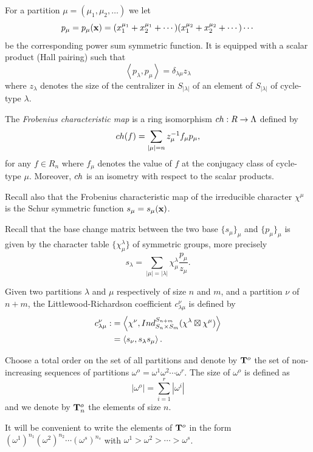 \documentclass[11pt]{article}
\theoremstyle{definition}
\numberwithin{equation}{section}
\newcommand{\x}{{\bf x}}
\begin{document}
For a partition $\mu=(\mu_1,\mu_2,\dots)$ we let 
$$
p_\mu=p_\mu(\x)=(x_1^{\mu_1}+x_2^{\mu_1}+\cdots)(x_1^{\mu_2}+x_2^{\mu_2}+\cdots)\cdots
$$
be the corresponding power sum symmetric function.  It is equipped  with a scalar product (Hall pairing) such that
$$
\left\langle p_\lambda,p_\mu\right\rangle=\delta_{\lambda\mu}z_\lambda
$$
where $z_\lambda$ denotes the size of the centralizer in $S_{|\lambda|}$ of an element of $S_{|\lambda|}$ of cycle-type $\lambda$.




The \emph{Frobenius characteristic map} \cite[Chap. I, \S 7]{macdonald} is a ring isomorphism  ${\rm ch}:R\rightarrow\Lambda$ defined by
$$
{\rm ch}(f)=\sum_{|\mu|=n}z_\mu^{-1}f_\mu p_\mu,
$$
for any $f\in R_n$  where $f_\mu$ denotes the value of $f$ at the conjugacy class of cycle-type $\mu$. Moreover, ${\rm ch}$ is an isometry with respect to the scalar products.



Recall also that the Frobenius characteristic map of the irreducible character $\chi^\mu$  is the Schur symmetric function $s_\mu=s_\mu(\x)$.


Recall that the base change matrix between the two base $\{s_\mu\}_\mu$ and $\{p_\mu\}_\mu$ is given by the character table $\{\chi^\lambda_\mu\}$ of symmetric groups, more precisely
\begin{equation}
	s_\lambda=\sum_{|\mu|=|\lambda|}\chi^\lambda_\mu\frac{p_\mu}{z_\mu}.
	\label{Sym}\end{equation}


Given two partitions $\lambda$ and $\mu$ respectively of size $n$ and $m$, and a partition $\nu$ of $n+m$, the Littlewood-Richardson coefficient $c_{\lambda\mu}^\nu$ is defined by
\begin{align}
	c_{\lambda\mu}^\nu:&=\left\langle \chi^\nu,{\rm Ind}_{S_n\times S_m}^{S_{n+m}}(\chi^\lambda\boxtimes\chi^\mu)\right\rangle\label{LRdef}\\
	&=\left\langle s_\nu,s_\lambda s_\mu\right\rangle.\label{LR1}
\end{align}

Choose a total order on the set of all partitions and denote by ${\bf T}^o$ the set of non-increasing sequences of partitions $\omega^o=\omega^1\omega^2\cdots\omega^r$. The size of $\omega^o$ is defined as 
$$
|\omega^o|=\sum_{i=1}^r|\omega^i|
$$
and we denote by ${\bf T}^o_n$ the elements of size $n$. 

It will be convenient to write the elements of ${\bf T}^o$ in the form $(\omega^1)^{n_1}(\omega^2)^{n_2}\cdots(\omega^s)^{n_s}$ with $\omega^1>\omega^2>\cdots>\omega^s$. 
\end{document}
